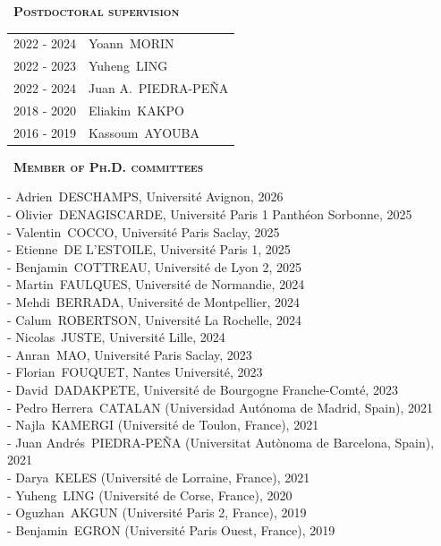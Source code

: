 \documentclass[a4paper,12pt]{article}
\newcommand{\smalltitre}[1]{%
	\noindent \textbullet~\textsc{\textbf{#1}}
	\smallskip
	}
\begin{document}
\smalltitre{Postdoctoral supervision}
	
\noindent \begin{longtable}{@{}p{\annee}p{\texte}@{}}
2022 - 2024 & Yoann~MORIN \\
2022 - 2023 & Yuheng~LING \\
2022 - 2024 & Juan A.~PIEDRA-PEÑA \\
2018 - 2020 & Eliakim~KAKPO \\
2016 - 2019 & Kassoum~AYOUBA \\
\end{longtable}


\smalltitre{Member of Ph.D. committees}\medskip
	
\noindent  
- Adrien~DESCHAMPS, Université Avignon, 2026 \\
- Olivier~DENAGISCARDE, Université Paris 1 Panthéon Sorbonne, 2025 \\
- Valentin~COCCO, Université Paris Saclay, 2025 \\
- Etienne~DE L'ESTOILE, Université Paris 1, 2025 \\
- Benjamin~COTTREAU, Université de Lyon 2, 2025 \\
- Martin~FAULQUES, Université de Normandie, 2024 \\
- Mehdi~BERRADA, Université de Montpellier, 2024 \\
- Calum~ROBERTSON, Université La Rochelle, 2024 \\
- Nicolas~JUSTE, Université Lille, 2024 \\
- Anran~MAO, Université Paris Saclay, 2023 \\
- Florian~FOUQUET, Nantes Université, 2023 \\
- David~DADAKPETE, Université de Bourgogne Franche-Comté, 2023 \\
- Pedro Herrera~CATALAN (Universidad Autónoma de Madrid, Spain), 2021 \\
- Najla~KAMERGI (Université de Toulon, France), 2021 \\
- Juan Andrés~PIEDRA-PEÑA (Universitat Autònoma de Barcelona, Spain), 2021 \\
- Darya~KELES (Université de Lorraine, France), 2021 \\
- Yuheng~LING (Université de Corse, France), 2020 \\
- Oguzhan~AKGUN (Université Paris 2, France), 2019 \\
- Benjamin~EGRON (Université Paris Ouest, France), 2019 \\
\end{document}
